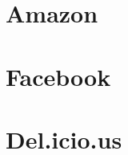 \documentclass[12pt,a4paper]{article}
\begin{document}
\section{Amazon}

\section{Facebook}

\section{Del.icio.us}
\end{document}

